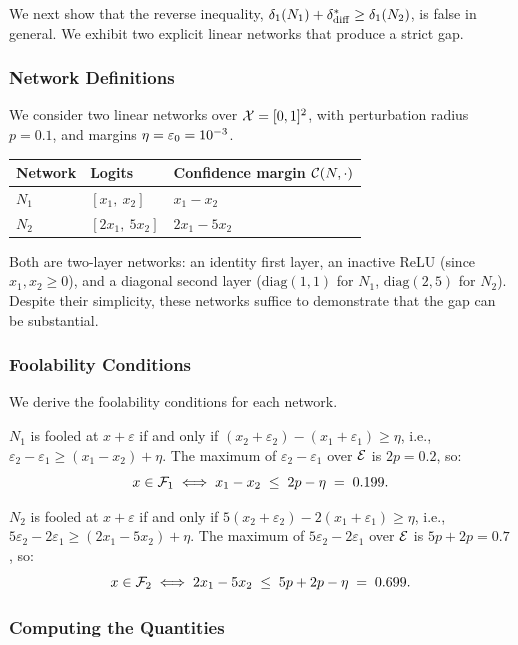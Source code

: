 We next show that the reverse inequality, $\delta_1(N_{1})+\delta_{\mathrm{diff}}^{*} \geq \delta_1(N_{2})$, is false in general. We exhibit two explicit linear networks that produce a strict gap.

\subsubsection{Network Definitions}

We consider two linear networks over $\mathcal{X}=[0,1]^2$, with perturbation radius $p=0.1$, and margins $\eta=\varepsilon_0=10^{-3}$.

\medskip
\begin{center}
\begin{tabular}{lll}
\toprule
Network & Logits & Confidence margin $\mathcal{C}(N,\cdot)$ \\
\midrule
$N_1$ & $[x_1,\ x_2]$ & $x_1-x_2$ \\[4pt]
$N_2$ & $[2x_1,\ 5x_2]$ & $2x_1-5x_2$ \\
\bottomrule
\end{tabular}
\end{center}

\medskip\noindent
Both are two-layer networks: an identity first layer, an inactive ReLU (since $x_1,x_2\geq 0$), and a diagonal second layer ($\mathrm{diag}(1,1)$ for $N_1$, $\mathrm{diag}(2,5)$ for $N_2$). Despite their simplicity, these networks suffice to demonstrate that the gap can be substantial.

\subsubsection{Foolability Conditions}

We derive the foolability conditions for each network.

$N_1$ is fooled at $x+\varepsilon$ if and only if $(x_2+\varepsilon_2)-(x_1+\varepsilon_1)\geq\eta$, i.e., $\varepsilon_2-\varepsilon_1\geq(x_1-x_2)+\eta$. The maximum of $\varepsilon_2-\varepsilon_1$ over $\mathcal{E}$ is $2p=0.2$, so:
\[
  x\in\mathcal{F}_{1}
  \;\Longleftrightarrow\;
  x_1-x_2\;\leq\;2p-\eta\;=\;0.199.
\]

$N_2$ is fooled at $x+\varepsilon$ if and only if $5(x_2+\varepsilon_2)-2(x_1+\varepsilon_1)\geq\eta$, i.e., $5\varepsilon_2-2\varepsilon_1\geq(2x_1-5x_2)+\eta$. The maximum of $5\varepsilon_2-2\varepsilon_1$ over $\mathcal{E}$ is $5p+2p=0.7$, so:
\[
  x\in\mathcal{F}_{2}
  \;\Longleftrightarrow\;
  2x_1-5x_2\;\leq\;5p+2p-\eta\;=\;0.699.
\]

\subsubsection{Computing the Quantities}

